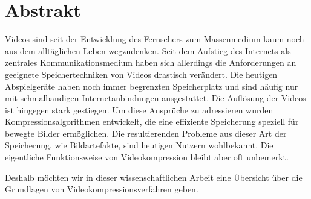 \chapter{Abstrakt}
Videos sind seit der Entwicklung des Fernsehers zum Massenmedium kaum noch aus dem alltäglichen Leben wegzudenken. Seit dem Aufstieg des Internets als zentrales Kommunikationsmedium haben sich allerdings die Anforderungen an geeignete Speichertechniken von Videos drastisch verändert. Die heutigen Abspielgeräte haben noch immer begrenzten Speicherplatz und sind häufig nur mit schmalbandigen Internetanbindungen ausgestattet. Die Auflösung der Videos ist hingegen stark gestiegen. Um diese Ansprüche zu adressieren wurden Kompressionsalgorithmen entwickelt, die eine effiziente Speicherung speziell für bewegte Bilder ermöglichen. Die resultierenden Probleme aus dieser Art der Speicherung, wie Bildartefakte, sind heutigen Nutzern wohlbekannt. Die eigentliche Funktionsweise von Videokompression bleibt aber oft unbemerkt.

Deshalb möchten wir in dieser wissenschaftlichen Arbeit eine Übersicht über die Grundlagen von Videokompressionsverfahren geben.